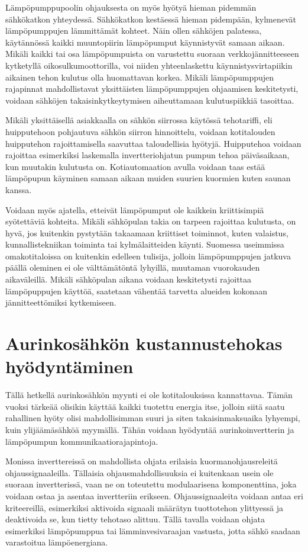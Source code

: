   Lämpöpumppupoolin ohjauksesta on myös hyötyä hieman pidemmän sähkökatkon yhteydessä. Sähkökatkon kestäessä hieman pidempään, kylmenevät lämpöpumppujen lämmittämät kohteet. Näin ollen sähköjen palatessa, käytännössä kaikki muuntopiirin lämpöpumput käynnistyvät samaan aikaan. Mikäli kaikki tai osa lämpöpumpuista on varustettu suoraan verkkojännitteeseen kytketyllä oikosulkumoottorilla, voi niiden yhteenlaskettu käynnistysvirtapiikin aikainen tehon kulutus olla huomattavan korkea. Mikäli lämpöpumppujen rajapinnat mahdollistavat yksittäisten lämpöpumppujen ohjaamisen keskitetysti, voidaan sähköjen takaisinkytkeytymisen aiheuttamaan kulutuspiikkiä tasoittaa.

  Mikäli yksittäisellä asiakkaalla on sähkön siirrossa käytössä tehotariffi, eli huipputehoon pohjautuva sähkön siirron hinnoittelu, voidaan kotitalouden huipputehon rajoittamisella saavuttaa taloudellisia hyötyjä. Huipputehoa voidaan rajoittaa esimerkiksi laskemalla invertteriohjatun pumpun tehoa päiväsaikaan, kun muutakin kulutusta on. Kotiautomaation avulla voidaan taas estää lämpöpupun käyminen samaan aikaan muiden suurien kuormien kuten saunan kanssa.

  Voidaan myös ajatella, etteivät lämpöpumput ole kaikkein kriittisimpiä syötettäviä kohteita. Mikäli sähköpulan takia on tarpeen rajoittaa kulutusta, on hyvä, jos kuitenkin pystytään takaamaan kriittiset toiminnot, kuten valaistus, kunnallistekniikan toiminta tai kylmälaitteiden käynti. Suomessa useimmissa omakotitaloissa on kuitenkin edelleen tulisija, jolloin lämpöpumppujen jatkuva päällä oleminen ei ole välttämätöntä lyhyillä, muutaman vuorokauden aikaväleillä. Mikäli sähköpulan aikana voidaan keskitetysti rajoittaa lämpöpuppujen käyttöä, saatetaan vähentää tarvetta alueiden kokonaan jännitteettömiksi kytkemiseen.

\section{Aurinkosähkön kustannustehokas hyödyntäminen}

  Tällä hetkellä aurinkosähkön myynti ei ole kotitalouksissa kannattavaa. Tämän vuoksi tärkeää olisikin käyttää kaikki tuotettu energia itse, jolloin siitä saatu rahallinen hyöty olisi mahdollisimman suuri ja siten takaisinmaksuaika lyhyempi, kuin ylijäämäsähköä myymällä. Tähän voidaan hyödyntää aurinkoinvertterin ja lämpöpumpun kommunikaatiorajapintoja.

  Monissa inverttereissä on mahdollista ohjata erilaisia kuormanohjausreleitä ohjaussignaaleilla. Tällaisia ohjausmahdollisuuksia ei kuitenkaan usein ole suoraan invertterissä, vaan ne on toteutettu modulaarisena komponenttina, joka voidaan ostaa ja asentaa invertteriin erikseen. Ohjaussignaaleita voidaan antaa eri kriteereillä, esimerkiksi aktivoida signaali määrätyn tuottotehon ylittyessä ja deaktivoida se, kun tietty tehotaso alittuu. Tällä tavalla voidaan ohjata esimerkiksi lämpöpumppua tai lämminvesivaraajan vastusta, jotta sähkö saadaan varastoitua lämpöenergiana.

